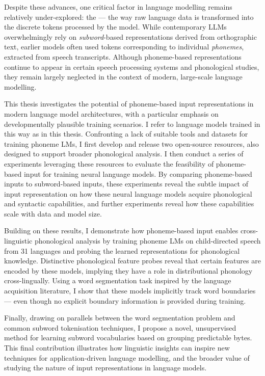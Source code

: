 Despite these advances, one critical factor in language modelling remains relatively under-explored: the  --- the way raw language data is transformed into the discrete tokens processed by the model. While contemporary LLMs overwhelmingly rely on \emph{subword}-based representations derived from orthographic text, earlier \ngram models often used tokens corresponding to individual \emph{phonemes}, extracted from speech transcripts. Although phoneme-based representations continue to appear in certain speech processing systems and phonological studies, they remain largely neglected in the context of modern, large-scale language modelling.

This thesis investigates the potential of phoneme-based input representations in modern language model architectures, with a particular emphasis on developmentally plausible training scenarios. I refer to language models trained in this way as  in this thesis. Confronting a lack of suitable tools and datasets for training phoneme LMs, I first develop and release two open-source resources, also designed to support broader phonological analysis. I then conduct a series of experiments leveraging these resources to evaluate the feasibility of phoneme-based input for training neural language models. By comparing phoneme-based inputs to subword-based inputs, these experiments reveal the subtle impact of input representation on how these neural language models acquire phonological and syntactic capabilities, and further experiments reveal how these capabilities scale with data and model size.

Building on these results, I demonstrate how phoneme-based input enables cross-linguistic phonological analysis by training phoneme LMs on child-directed speech from 31 languages and probing the learned representations for phonological knowledge. Distinctive phonological feature probes reveal that certain features are encoded by these models, implying they have a role in distributional phonology cross-lingually. Using a word segmentation task inspired by the language acquisition literature, I show that these models implicitly track word boundaries --- even though no explicit boundary information is provided during training.

Finally, drawing on parallels between the word segmentation problem and common subword tokenisation techniques, I propose a novel, unsupervised method for learning subword vocabularies based on grouping predictable bytes. This final contribution illustrates how linguistic insights can inspire new techniques for application-driven language modelling, and the broader value of studying the nature of input representations in language models.

